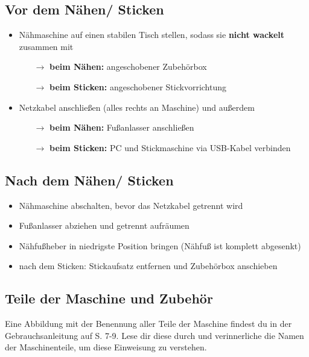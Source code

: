 \documentclass{\basedir/fablab-document}
\newcommand{\pfeil}{\ensuremath{\rightarrow}}
\begin{document}
\subsection{Vor dem Nähen/ Sticken}
\begin{itemize}
 \item Nähmaschine auf einen stabilen Tisch stellen, sodass sie \textbf{nicht wackelt} zusammen mit
 \begin{itemize}
 	\item[\pfeil] \textbf{beim Nähen:} angeschobener Zubehörbox
 	\item[\pfeil] \textbf{beim Sticken:} angeschobener Stickvorrichtung
 \end{itemize}
 \item Netzkabel anschließen (alles rechts an Maschine) und außerdem
  \begin{itemize}
 	\item[\pfeil] \textbf{beim Nähen:} Fußanlasser anschließen
 	\item[\pfeil] \textbf{beim Sticken:} PC und Stickmaschine via USB-Kabel verbinden
 \end{itemize}
\end{itemize}

\subsection{Nach dem Nähen/ Sticken}
\begin{itemize}
 \item Nähmaschine abschalten, bevor das Netzkabel getrennt wird
 \item Fußanlasser abziehen und getrennt aufräumen
 \item Nähfußheber in niedrigste Position bringen (Nähfuß ist komplett abgesenkt)
 \item nach dem Sticken: Stickaufsatz entfernen und Zubehörbox anschieben
\end{itemize}

\subsection{Teile der Maschine und Zubehör}

Eine Abbildung mit der Benennung aller Teile der Maschine findest du in der Gebrauchsanleitung auf S. 7-9. Lese dir diese durch und verinnerliche die Namen der Maschinenteile, um diese Einweisung zu verstehen.

\vspace{2em}
\end{document}

